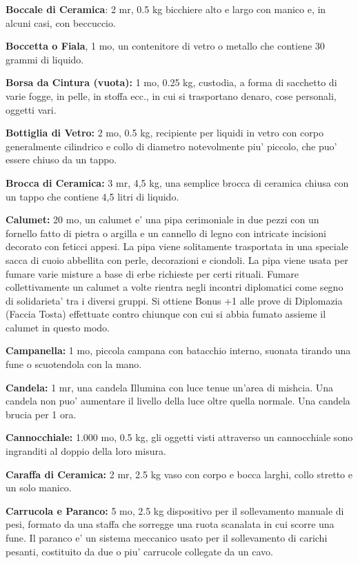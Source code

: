 \documentclass[a4paper,11pt,twoside,openany]{book}
\begin{document}
{\textbf{Boccale di Ceramica}: 2 mr, 0.5 kg bicchiere alto e largo con manico e, in alcuni casi, con beccuccio.

\textbf{Boccetta o Fiala}, 1 mo, un contenitore di vetro o metallo che contiene 30 grammi di liquido.

\textbf{Borsa da Cintura (vuota):} 1 mo, 0.25 kg, custodia, a forma di sacchetto di varie fogge, in pelle, in stoffa ecc., in cui si trasportano denaro, cose personali, oggetti vari.

\textbf{Bottiglia di Vetro:} 2 mo, 0.5 kg, recipiente per liquidi in vetro con corpo generalmente cilindrico e collo di diametro notevolmente piu' piccolo, che puo' essere chiuso da un tappo.

\textbf{Brocca di Ceramica:} 3 mr, 4,5 kg, una semplice brocca di ceramica chiusa con un tappo che contiene 4,5 litri di liquido.

\textbf{Calumet:} 20 mo, un calumet e' una pipa cerimoniale in due pezzi con un fornello fatto di pietra o argilla e un cannello di legno con intricate incisioni decorato con feticci appesi. La pipa viene solitamente trasportata in una speciale sacca di cuoio abbellita con perle, decorazioni e ciondoli. La pipa viene usata per fumare varie misture a base di erbe richieste per certi rituali. Fumare collettivamente un calumet a volte rientra negli incontri diplomatici come segno di solidarieta' tra i diversi gruppi. Si ottiene Bonus +1 alle prove di Diplomazia (Faccia Tosta) effettuate contro chiunque con cui si abbia fumato assieme il calumet in questo modo.

\textbf{Campanella:} 1 mo, piccola campana con batacchio interno, suonata tirando una fune o scuotendola con la mano.

\textbf{Candela:} 1 mr, una candela Illumina con luce tenue un'area di mishcia. Una candela non puo' aumentare il livello della luce oltre quella normale. Una candela brucia per 1 ora.

\textbf{Cannocchiale:} 1.000 mo, 0.5 kg, gli oggetti visti attraverso un cannocchiale sono ingranditi al doppio della loro misura.

\textbf{Caraffa di Ceramica:} 2 mr, 2.5 kg vaso con corpo e bocca larghi, collo stretto e un solo manico.

\textbf{Carrucola e Paranco:} 5 mo, 2.5 kg dispositivo per il sollevamento manuale di pesi, formato da una staffa che sorregge una ruota scanalata in cui scorre una fune. Il paranco e' un sistema meccanico usato per il sollevamento di carichi pesanti, costituito da due o piu' carrucole collegate da un cavo.

}
\end{document}
